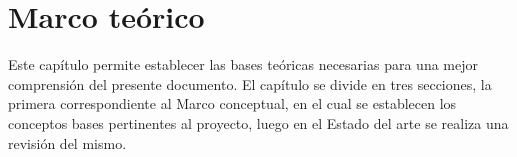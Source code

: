 \chapter{Marco teórico}
Este capítulo permite establecer las bases teóricas necesarias para una mejor comprensión del presente documento. El capítulo se divide en tres secciones, la primera correspondiente al Marco conceptual, en el cual se establecen los conceptos bases pertinentes al proyecto, luego en el Estado del arte se realiza una revisión del mismo.